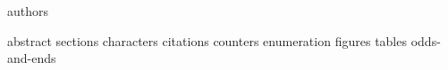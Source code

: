 %
%

%
%
{authors}

%
%

\title{\fulltitle}

%


%
%

{abstract}
%
%
\keywords{\dockeywords}
{sections}
{characters}
{citations}
{counters}
{enumeration}
{figures}
{tables}
{odds-and-ends}

%
%
\newpage


